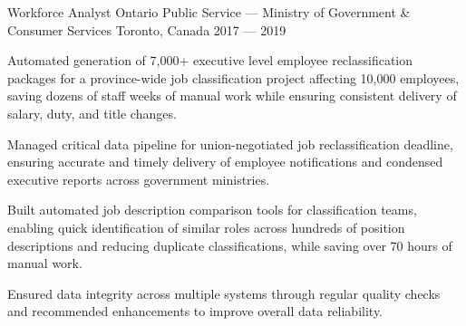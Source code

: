 \begin{cventries}
\cventry%
	{Workforce Analyst}
	{Ontario Public Service --- Ministry of Government \& Consumer Services}
	{Toronto, Canada}
	{2017 --- 2019}
	{
		\begin{cvitems}
			\item Automated generation of 7,000+ executive level employee reclassification packages for a province-wide job classification project affecting 10,000 employees, saving dozens of staff weeks of manual work while ensuring consistent delivery of salary, duty, and title changes.
			\item Managed critical data pipeline for union-negotiated job reclassification deadline, ensuring accurate and timely delivery of employee notifications and condensed executive reports across government ministries.
			\item Built automated job description comparison tools for classification teams, enabling quick identification of similar roles across hundreds of position descriptions and reducing duplicate classifications, while saving over 70 hours of manual work.
			\item Ensured data integrity across multiple systems through regular quality checks and recommended enhancements to improve overall data reliability.
		\end{cvitems}
	}


\end{cventries}